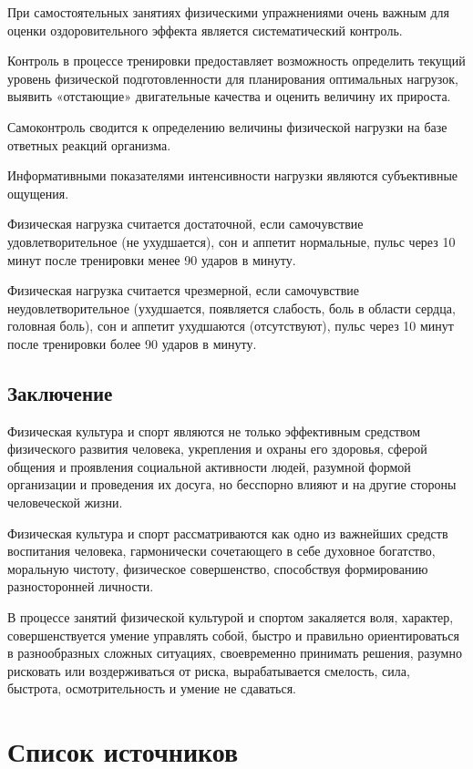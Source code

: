 \documentclass[a4paper]{article}
\begin{document}
    При самостоятельных занятиях физическими упражнениями очень важным для оценки оздоровительного эффекта является систематический контроль.

    Контроль в процессе тренировки предоставляет возможность определить текущий уровень физической подготовленности для планирования оптимальных нагрузок, выявить «отстающие» двигательные качества и оценить величину их прироста.

    Самоконтроль сводится к определению величины физической нагрузки на базе ответных реакций организма.

    Информативными показателями интенсивности нагрузки являются субъективные ощущения.

    Физическая нагрузка считается достаточной, если самочувствие удовлетворительное (не ухудшается), сон и аппетит нормальные, пульс через 10 минут после тренировки менее 90 ударов в минуту.

    Физическая нагрузка считается чрезмерной, если самочувствие неудовлетворительное (ухудшается, появляется слабость, боль в области сердца, головная боль), сон и аппетит ухудшаются (отсутствуют), пульс через 10 минут после тренировки более 90 ударов в минуту.

    \subsection{Заключение}

    Физическая культура и спорт являются не только эффективным средством физического развития человека, укрепления и охраны его здоровья, сферой общения и проявления социальной активности людей, разумной формой организации и проведения их досуга, но бесспорно влияют и на другие стороны человеческой жизни.

    Физическая культура и спорт рассматриваются как одно из важнейших средств воспитания человека, гармонически сочетающего в себе духовное богатство, моральную чистоту, физическое совершенство, способствуя формированию разносторонней личности.

    В процессе занятий физической культурой и спортом закаляется воля, характер, совершенствуется умение управлять собой, быстро и правильно ориентироваться в разнообразных сложных ситуациях, своевременно принимать решения, разумно рисковать или воздерживаться от риска, вырабатывается смелость, сила, быстрота, осмотрительность и умение не сдаваться.

    \newpage
    
    \section{Список источников}
\end{document}
